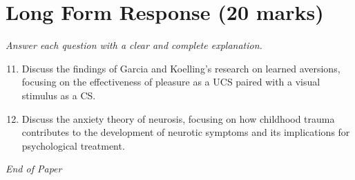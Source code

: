 \documentclass[12pt]{article}
\begin{document}
\section*{Long Form Response (20 marks)}
\textit{Answer each question with a clear and complete explanation.}
\begin{enumerate}[label=\arabic*.]
\setcounter{enumi}{10}
\item Discuss the findings of Garcia and Koelling's research on learned aversions, focusing on the effectiveness of pleasure as a UCS paired with a visual stimulus as a CS.
\item Discuss the anxiety theory of neurosis, focusing on how childhood trauma contributes to the development of neurotic symptoms and its implications for psychological treatment.
\end{enumerate}

\vfill
\noindent\textit{End of Paper}
\end{document}
